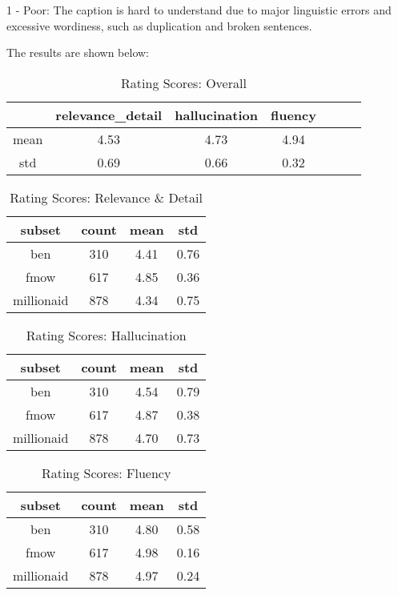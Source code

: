 \documentclass[journal]{IEEEtran}
\begin{document}
1 - Poor: The caption is hard to understand due to major linguistic errors and excessive wordiness, such as duplication and broken sentences.


The results are shown below:


\begin{table}[H]
\caption{Rating Scores: Overall}
\centering
\begin{tabular}{|c|c|c|c|c|c|c|}\hline
   & relevance\_detail &	hallucination &	fluency\\ \hline
   mean &	4.53 &	4.73 & 4.94\\ \hline
   std &	0.69 &	0.66 & 0.32\\ \hline
\end{tabular}
\end{table}

\begin{table}[H]
\caption{Rating Scores: Relevance \& Detail}
\centering
\begin{tabular}{|c|c|c|c|}\hline
   subset & count &	mean &	std\\ \hline
   ben	 &310	 &4.41 &	0.76\\ \hline
   fmow	 & 617 &	4.85 &	0.36\\ \hline
   millionaid &	878 &	4.34 &	0.75 \\ \hline
\end{tabular}
\end{table}

\begin{table}[H]
\caption{Rating Scores: Hallucination}
\centering
\begin{tabular}{|c|c|c|c|}\hline
   subset & count &	mean &	std\\ \hline
   ben	 &310	 & 4.54 &	0.79\\ \hline
   fmow	 & 617 & 4.87 &	0.38\\ \hline
   millionaid &	878 & 4.70 & 0.73 \\ \hline
\end{tabular}
\end{table}


\begin{table}[H]
\caption{Rating Scores: Fluency}
\centering
\begin{tabular}{|c|c|c|c|}\hline
   subset & count &	mean &	std\\ \hline
   ben	 &310	 & 4.80 &	0.58\\ \hline
   fmow	 & 617 &	4.98 &	0.16\\ \hline
   millionaid &	878 &	4.97 &	0.24 \\ \hline
\end{tabular}
\end{table}
\end{document}

